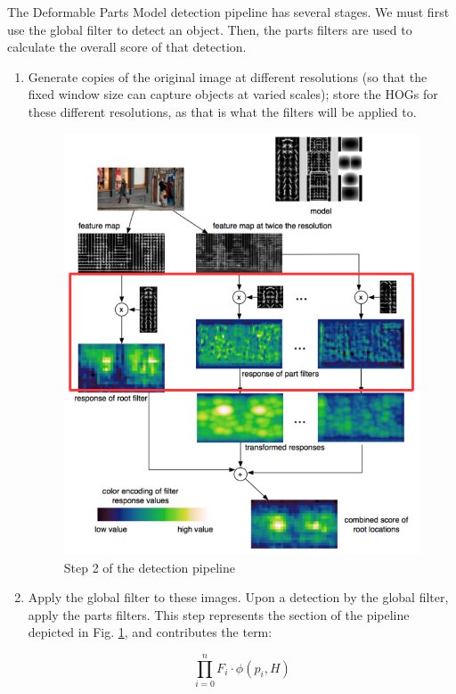 \documentclass{article}
\begin{document}
The Deformable Parts Model detection pipeline has several stages. We must first use the global filter to detect an object. Then, the parts filters are used to calculate the overall score of that detection.
\begin{enumerate}
\item Generate copies of the original image at different resolutions (so that the fixed window size can capture objects at varied scales); store the HOGs for these different resolutions, as that is what the filters will be applied to.



\begin{figure}[H]
	\center
	\includegraphics[scale=0.2]{pipeline2a.png}
    \caption{Step 2 of the detection pipeline}
    \label{fig:pipeline2a}
\end{figure}
\item Apply the global filter to these images. Upon a detection by the global filter, apply the parts filters. This step represents the section of the pipeline depicted in Fig. \ref{fig:pipeline2a}, and contributes the term:

$$\prod_{i=0}^{n}F_i \cdot \phi(p_i,H)$$




\end{enumerate}
\end{document}
